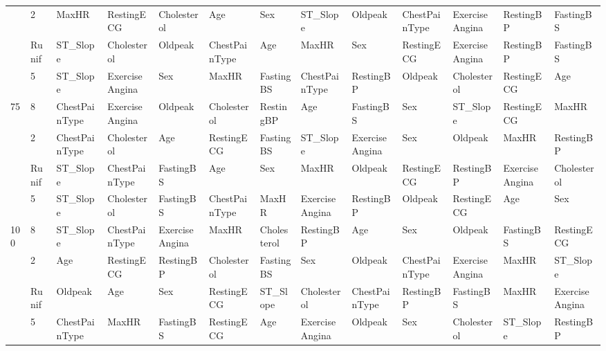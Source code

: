 \begin{table}[htbp]
\begin{tabular}{lllllllllllll}
 & 2 & MaxHR & RestingECG & Cholesterol & Age & Sex & ST_Slope & Oldpeak & ChestPainType & ExerciseAngina & RestingBP & FastingBS \\
 & Runif & ST_Slope & Cholesterol & Oldpeak & ChestPainType & Age & MaxHR & Sex & RestingECG & ExerciseAngina & RestingBP & FastingBS \\
 & 5 & ST_Slope & ExerciseAngina & Sex & MaxHR & FastingBS & ChestPainType & RestingBP & Oldpeak & Cholesterol & RestingECG & Age \\
\multirow[c]{4}{*}{75} & 8 & ChestPainType & ExerciseAngina & Oldpeak & Cholesterol & RestingBP & Age & FastingBS & Sex & ST_Slope & RestingECG & MaxHR \\
 & 2 & ChestPainType & Cholesterol & Age & RestingECG & FastingBS & ST_Slope & ExerciseAngina & Sex & Oldpeak & MaxHR & RestingBP \\
 & Runif & ST_Slope & ChestPainType & FastingBS & Age & Sex & MaxHR & Oldpeak & RestingECG & RestingBP & ExerciseAngina & Cholesterol \\
 & 5 & ST_Slope & Cholesterol & FastingBS & ChestPainType & MaxHR & ExerciseAngina & RestingBP & Oldpeak & RestingECG & Age & Sex \\
\multirow[c]{4}{*}{100} & 8 & ST_Slope & ChestPainType & ExerciseAngina & MaxHR & Cholesterol & RestingBP & Age & Sex & Oldpeak & FastingBS & RestingECG \\
 & 2 & Age & RestingECG & RestingBP & Cholesterol & FastingBS & Sex & Oldpeak & ChestPainType & ExerciseAngina & MaxHR & ST_Slope \\
 & Runif & Oldpeak & Age & Sex & RestingECG & ST_Slope & Cholesterol & ChestPainType & RestingBP & FastingBS & MaxHR & ExerciseAngina \\
 & 5 & ChestPainType & MaxHR & FastingBS & RestingECG & Age & ExerciseAngina & Oldpeak & Sex & Cholesterol & ST_Slope & RestingBP \\
\bottomrule
\end{tabular}
\end{table}
